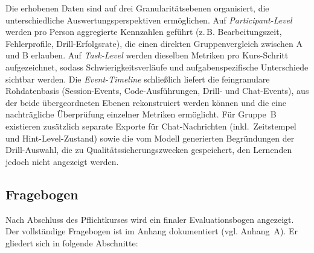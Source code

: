 Die erhobenen Daten sind auf drei Granularitätsebenen organisiert, die unterschiedliche Auswertungsperspektiven ermöglichen. Auf \textit{Participant-Level} werden pro Person aggregierte Kennzahlen geführt (z.\,B. Bearbeitungszeit, Fehlerprofile, Drill-Erfolgsrate), die einen direkten Gruppenvergleich zwischen A und B erlauben. Auf \textit{Task-Level} werden dieselben Metriken pro Kurs-Schritt aufgezeichnet, sodass Schwierigkeitsverläufe und aufgabenspezifische Unterschiede sichtbar werden. Die \textit{Event-Timeline} schließlich liefert die feingranulare Rohdatenbasis (Session-Events, Code-Ausführungen, Drill- und Chat-Events), aus der beide übergeordneten Ebenen rekonstruiert werden können und die eine nachträgliche Überprüfung einzelner Metriken ermöglicht. Für Gruppe~B existieren zusätzlich separate Exporte für Chat-Nachrichten (inkl.\ Zeitstempel und Hint-Level-Zustand) sowie die vom Modell generierten Begründungen der Drill-Auswahl, die zu Qualitätssicherungszwecken gespeichert, den Lernenden jedoch nicht angezeigt werden.

\subsection{Fragebogen}\label{subsec:fragebogen}

Nach Abschluss des Pflichtkurses wird ein finaler Evaluationsbogen angezeigt. Der vollständige Fragebogen ist im Anhang dokumentiert (vgl. Anhang~A). Er gliedert sich in folgende Abschnitte:

